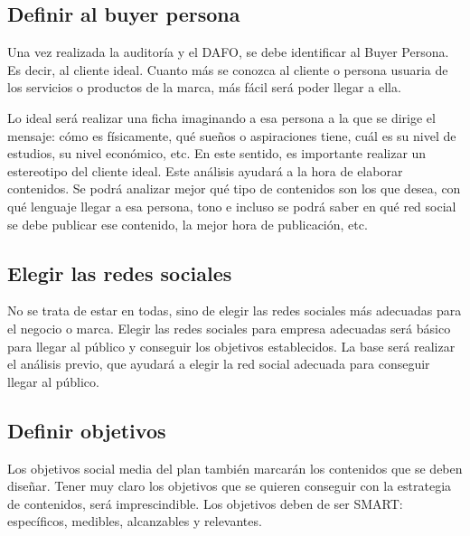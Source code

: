 \subsection{Definir al buyer persona}

Una vez realizada la auditoría y el DAFO, se debe identificar al Buyer Persona. Es decir, al cliente ideal. Cuanto más se conozca al cliente o persona usuaria de los servicios o productos de la marca, más fácil será poder llegar a ella. 

Lo ideal será realizar una ficha imaginando a esa persona a la que se dirige el mensaje: cómo es físicamente, qué sueños o aspiraciones tiene, cuál es su nivel de estudios, su nivel económico, etc. En este sentido, es importante realizar un estereotipo del cliente ideal. Este análisis ayudará a la hora de elaborar contenidos. Se podrá analizar mejor qué tipo de contenidos son los que desea, con qué lenguaje llegar a esa persona, tono  e incluso se podrá saber en qué red social se debe publicar ese contenido, la mejor hora de publicación, etc.

\subsection{Elegir las redes sociales}

No se trata de estar en todas, sino de elegir las redes sociales más adecuadas para el negocio o marca. Elegir las redes sociales para empresa adecuadas será básico para llegar al público y conseguir los objetivos establecidos. La base será realizar el análisis previo, que ayudará a elegir la red social adecuada para conseguir llegar al público.

\subsection{Definir objetivos}

Los objetivos social media del plan también marcarán los contenidos que se deben diseñar. Tener muy claro los objetivos que se quieren conseguir con la estrategia de contenidos, será imprescindible. Los objetivos deben de ser SMART: específicos, medibles, alcanzables y relevantes. 

